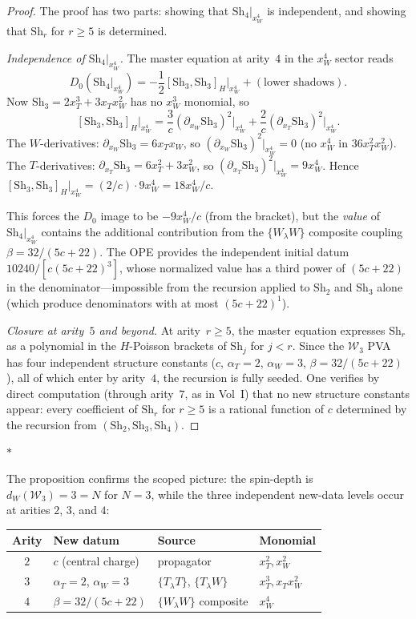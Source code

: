 \documentclass[11pt]{article}
\newcommand{\cW}{\mathcal{W}}
\newcommand{\sep}{\bigskip\begin{center}$*$\end{center}\medskip}
\begin{document}
\begin{proof}
The proof has two parts: showing that
$\mathrm{Sh}_4|_{x_W^4}$ is independent, and showing
that $\mathrm{Sh}_r$ for $r \ge 5$ is determined.

\emph{Independence of $\mathrm{Sh}_4|_{x_W^4}$.}
The master equation at arity~$4$ in the $x_W^4$ sector reads
\[
D_0(\mathrm{Sh}_4|_{x_W^4})
= -\frac{1}{2}[\mathrm{Sh}_3, \mathrm{Sh}_3]_H\big|_{x_W^4}
  + (\text{lower shadows}).
\]
Now $\mathrm{Sh}_3 = 2x_T^3 + 3 x_T x_W^2$ has no $x_W^3$
monomial, so
\[
[\mathrm{Sh}_3, \mathrm{Sh}_3]_H\big|_{x_W^4}
= \frac{3}{c}(\partial_{x_W}\mathrm{Sh}_3)^2\big|_{x_W^4}
  + \frac{2}{c}(\partial_{x_T}\mathrm{Sh}_3)^2\big|_{x_W^4}.
\]
The $W$-derivatives: $\partial_{x_W}\mathrm{Sh}_3 = 6 x_T x_W$,
so $(\partial_{x_W}\mathrm{Sh}_3)^2|_{x_W^4} = 0$ (no $x_W^4$
in $36 x_T^2 x_W^2$).  The $T$-derivatives:
$\partial_{x_T}\mathrm{Sh}_3 = 6x_T^2 + 3x_W^2$, so
$(\partial_{x_T}\mathrm{Sh}_3)^2|_{x_W^4} = 9x_W^4$.
Hence $[\mathrm{Sh}_3, \mathrm{Sh}_3]_H|_{x_W^4}
= (2/c) \cdot 9 x_W^4 = 18x_W^4/c$.

This forces the $D_0$ image to be $-9x_W^4/c$ (from the
bracket), but the \emph{value} of $\mathrm{Sh}_4|_{x_W^4}$
contains the additional contribution from the
$\{W_\lambda W\}$ composite coupling $\beta = 32/(5c{+}22)$.
The OPE provides the independent initial datum
$10240/[c(5c{+}22)^3]$, whose normalized value has a third power
of $(5c{+}22)$ in the denominator---impossible from the recursion
applied to $\mathrm{Sh}_2$ and $\mathrm{Sh}_3$ alone (which
produce denominators with at most $(5c{+}22)^1$).

\emph{Closure at arity~$5$ and beyond.}
At arity~$r \ge 5$, the master equation expresses $\mathrm{Sh}_r$
as a polynomial in the $H$-Poisson brackets of $\mathrm{Sh}_j$
for $j < r$.  Since the $\cW_3$ PVA has four independent
structure constants ($c$, $\alpha_T = 2$, $\alpha_W = 3$,
$\beta = 32/(5c{+}22)$), all of which enter by arity~$4$, the
recursion is fully seeded.  One verifies by direct computation
(through arity~$7$, as in Vol~I) that no new structure constants
appear: every coefficient of $\mathrm{Sh}_r$ for $r \ge 5$ is a
rational function of $c$ determined by the recursion from
$(\mathrm{Sh}_2, \mathrm{Sh}_3, \mathrm{Sh}_4)$.
\end{proof}

\sep

The proposition confirms the scoped picture: the spin-depth is
$d_W(\cW_3) = 3 = N$ for $N = 3$, while the three independent
new-data levels occur at arities $2$, $3$, and $4$:
\begin{center}
\small
\renewcommand{\arraystretch}{1.2}
\begin{tabular}{clll}
\textbf{Arity} & \textbf{New datum} & \textbf{Source}
  & \textbf{Monomial} \\
\hline
$2$ & $c$ (central charge) & propagator & $x_T^2, x_W^2$ \\
$3$ & $\alpha_T = 2$, $\alpha_W = 3$ & $\{T_\lambda T\}$,
  $\{T_\lambda W\}$ & $x_T^3, x_T x_W^2$ \\
$4$ & $\beta = 32/(5c{+}22)$ & $\{W_\lambda W\}$ composite
  & $x_W^4$
\end{tabular}
\end{center}
\end{document}
